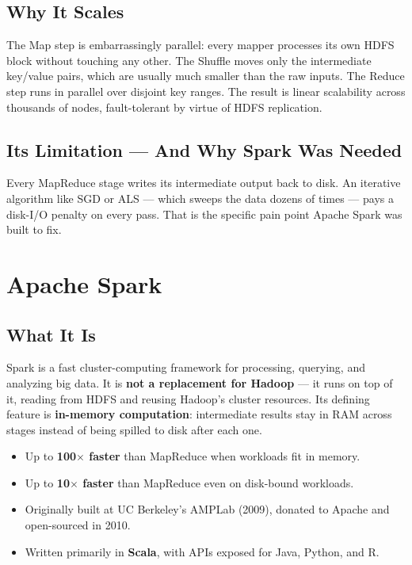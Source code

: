 \documentclass[11pt]{article}
\begin{document}
\subsection{Why It Scales}
The Map step is embarrassingly parallel: every mapper processes its own HDFS block without touching any other. The Shuffle moves only the intermediate key/value pairs, which are usually much smaller than the raw inputs. The Reduce step runs in parallel over disjoint key ranges. The result is linear scalability across thousands of nodes, fault-tolerant by virtue of HDFS replication.

\subsection{Its Limitation --- And Why Spark Was Needed}
Every MapReduce stage writes its intermediate output back to disk. An iterative algorithm like SGD or ALS --- which sweeps the data dozens of times --- pays a disk-I/O penalty on every pass. That is the specific pain point Apache Spark was built to fix.


\section{Apache Spark}

\subsection{What It Is}
Spark is a fast cluster-computing framework for processing, querying, and analyzing big data. It is \textbf{not a replacement for Hadoop} --- it runs on top of it, reading from HDFS and reusing Hadoop's cluster resources. Its defining feature is \textbf{in-memory computation}: intermediate results stay in RAM across stages instead of being spilled to disk after each one.

\begin{itemize}
    \item Up to \textbf{100$\times$ faster} than MapReduce when workloads fit in memory.
    \item Up to \textbf{10$\times$ faster} than MapReduce even on disk-bound workloads.
    \item Originally built at UC Berkeley's AMPLab (2009), donated to Apache and open-sourced in 2010.
    \item Written primarily in \textbf{Scala}, with APIs exposed for Java, Python, and R.
\end{itemize}
\end{document}

